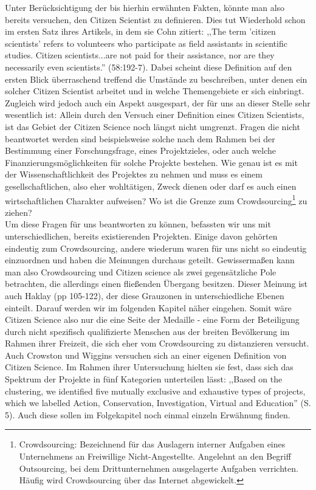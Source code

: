\documentclass{article}
\begin{document}
Unter Berücksichtigung der bis hierhin erwähnten Fakten, könnte man also bereits versuchen, den Citizen Scientist zu definieren. Dies tut Wiederhold schon im ersten Satz ihres Artikels, in dem sie Cohn zitiert: ,,The term 'citizen scientists' refers to volunteers who participate as field assistants in scientific studies. Citizen scientists...are not paid for their assistance, nor are they necessarily even scientists.'' \cite{Cohn} (58:192-7). Dabei scheint diese Definition auf den ersten Blick überraschend treffend die Umstände zu beschreiben, unter denen ein solcher Citizen Scientist arbeitet und in welche Themengebiete er sich einbringt. Zugleich wird jedoch auch ein Aspekt ausgespart, der für uns an dieser Stelle sehr wesentlich ist: Allein durch den Versuch einer Definition eines Citizen Scientists, ist das Gebiet der Citizen Science noch längst nicht umgrenzt. Fragen die nicht beantwortet werden sind beispielsweise solche nach dem Rahmen bei der Bestimmung einer Forschungsfrage, eines Projektzieles, oder auch welche Finanzierungsmöglichkeiten für solche Projekte bestehen. Wie genau ist es mit der Wissenschaftlichkeit des Projektes zu nehmen und muss es einem gesellschaftlichen, also eher wohltätigen, Zweck dienen oder darf es auch einen wirtschaftlichen Charakter aufweisen? Wo ist die Grenze zum Crowdsourcing\footnote{Crowdsourcing: Bezeichnend für das Auslagern interner Aufgaben eines Unternehmens an Freiwillige Nicht-Angestellte. Angelehnt an den Begriff Outsourcing, bei dem Drittunternehmen ausgelagerte Aufgaben verrichten. Häufig wird Crowdsourcing über das Internet abgewickelt.} zu ziehen?\\
Um diese Fragen für uns beantworten zu können, befassten wir uns mit unterschiedlichen, bereits existierenden Projekten. Einige davon gehörten eindeutig zum Crowdsourcing, andere wiederum waren für uns nicht so eindeutig einzuordnen und haben die Meinungen durchaus geteilt. Gewissermaßen kann man also Crowdsourcing und Citizen science als zwei gegensätzliche Pole betrachten, die allerdings einen fließenden Übergang besitzen. Dieser Meinung ist auch Haklay\cite{Haklay} (pp 105-122), der diese Grauzonen in unterschiedliche Ebenen einteilt. Darauf werden wir im folgenden Kapitel näher eingehen. Somit wäre Citizen Science also nur die eine Seite der Medaille - eine Form der Beteiligung durch nicht spezifisch qualifizierte Menschen aus der breiten Bevölkerung im Rahmen ihrer Freizeit, die sich eher vom Crowdsourcing zu distanzieren versucht.
\newline
Auch Crowston und Wiggins\cite{CW} versuchen sich an einer eigenen Definition von Citizen Science. Im Rahmen ihrer Untersuchung hielten sie fest, dass sich das Spektrum der Projekte in fünf Kategorien unterteilen lässt: ,,Based on the clustering, we identified five mutually exclusive and exhaustive types of projects, which we labelled Action, Conservation, Investigation, Virtual and Education'' (S. 5). Auch diese sollen im Folgekapitel noch einmal einzeln Erwähnung finden.
\end{document}
